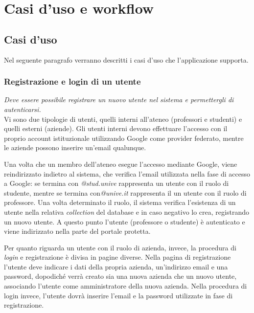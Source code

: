 \chapter{Casi d'uso e workflow}

\section{Casi d'uso}

Nel seguente paragrafo verranno descritti i casi d'uso che l'applicazione supporta.

\subsection{Registrazione e login di un utente}

\textit{Deve essere possibile registrare un nuovo utente nel sistema e permettergli di autenticarsi.} \\

\noindent
Vi sono due tipologie di utenti, quelli interni all'ateneo (professori e studenti) e quelli esterni (aziende). Gli utenti interni devono effettuare l'accesso con il proprio account istituzionale utilizzando Google come provider federato, mentre le aziende possono inserire un'email qualunque. 

Una volta che un membro dell'ateneo esegue l'accesso mediante Google, viene reindirizzato indietro al sistema, che verifica l'email utilizzata nella fase di accesso a Google: se termina con \textit{@stud.unive} rappresenta un utente con il ruolo di studente, mentre se termina con\textit{@unive.it} rappresenta il un utente con il ruolo di professore. Una volta determinato il ruolo, il sistema verifica l'esistenza di un utente nella relativa \textit{collection} del database e in caso negativo lo crea, registrando un nuovo utente. A questo punto l'utente (professore o studente) è autenticato e viene indirizzato nella parte del portale protetta.

Per quanto riguarda un utente con il ruolo di azienda, invece, la procedura di \textit{login} e registrazione è divisa in pagine diverse. Nella pagina di registrazione l'utente deve indicare i dati della propria azienda, un'indirizzo email e una password, dopodiché verrà creato sia una nuova azienda che un nuovo utente, associando l'utente come amministratore della nuova azienda. Nella procedura di login invece, l'utente dovrà inserire l'email e la password utilizzate in fase di registrazione.

